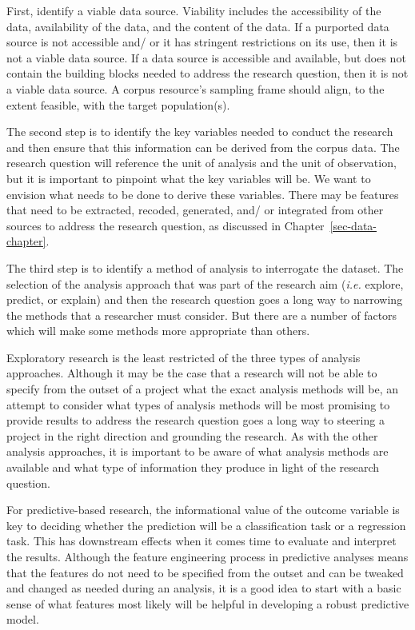 \documentclass[
  letterpaper,
  krantz1]{latex/krantz-mod}
\theoremstyle{definition}
\theoremstyle{definition}
\theoremstyle{remark}
\begin{document}
First, identify a viable data source. Viability includes the
accessibility of the data, availability of the data, and the content of
the data. If a purported data source is not accessible and/ or it has
stringent restrictions on its use, then it is not a viable data source.
If a data source is accessible and available, but does not contain the
building blocks needed to address the research question, then it is not
a viable data source. A corpus resource's sampling
frame should align, to the extent feasible, with
the target population(s).

The second step is to identify the key variables needed to conduct the
research and then ensure that this information can be derived from the
corpus data. The research question will
reference the unit of analysis and the unit of
observation, but it is important to pinpoint
what the key variables will be. We want to envision what needs to be
done to derive these variables. There may be
features that need to be extracted, recoded, generated, and/ or
integrated from other sources to address the research question, as
discussed in Chapter~\ref{sec-data-chapter}.

The third step is to identify a method of analysis
to interrogate the dataset. The selection of the analysis approach that
was part of the research aim (\emph{i.e.} explore, predict, or explain)
and then the research question goes a long way to narrowing the methods
that a researcher must consider. But there are a number of factors which
will make some methods more appropriate than others.

Exploratory research is the least
restricted of the three types of analysis approaches. Although it may be
the case that a research will not be able to specify from the outset of
a project what the exact analysis methods will be, an attempt to
consider what types of analysis methods will be most promising to
provide results to address the research question goes a long way to
steering a project in the right direction and grounding the research. As
with the other analysis approaches, it is important to be aware of what
analysis methods are available and what type of information they produce
in light of the research question.

For predictive-based research, the
informational value of the outcome variable is key to deciding whether
the prediction will be a classification task or a regression task. This
has downstream effects when it comes time to evaluate and interpret the
results. Although the feature engineering process in predictive analyses
means that the features do not need to be specified from the outset and
can be tweaked and changed as needed during an analysis, it is a good
idea to start with a basic sense of what features most likely will be
helpful in developing a robust predictive model.
\end{document}
